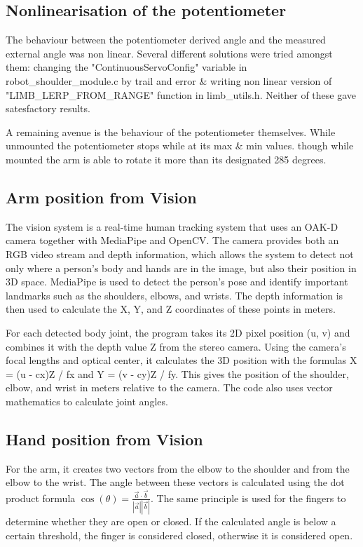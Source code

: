 \documentclass[a4paper]{article}
\begin{document}
\subsection{Nonlinearisation of the potentiometer}

The behaviour between the potentiometer derived angle and the measured external angle was non linear. 
Several different solutions were tried amongst them: changing the "ContinuousServoConfig" variable in robot\_shoulder\_module.c by trail and error \&
writing non linear version of "LIMB\_LERP\_FROM\_RANGE" function in limb\_utils.h. Neither of these gave satesfactory results.

A remaining avenue is the behaviour of the potentiometer themselves. While unmounted the potentiometer stops while at its max \& min values. though while mounted the arm is able to rotate it more than its designated 285 degrees. 

\subsection{Arm position from Vision}
The vision system is a real-time human tracking system that uses an OAK-D camera together with MediaPipe and OpenCV. The camera provides both an RGB video stream and depth information, which allows the system to detect not only where a person's body and hands are in the image, but also their position in 3D space. MediaPipe is used to detect the person's pose and identify important landmarks such as the shoulders, elbows, and wrists. The depth information is then used to calculate the X, Y, and Z coordinates of these points in meters. 

For each detected body joint, the program takes its 2D pixel position (u, v) and combines it with the depth value Z from the stereo camera. Using the camera's focal lengths and optical center, it calculates the 3D position with the formulas X = (u - cx)Z / fx and Y = (v - cy)Z / fy. This gives the position of the shoulder, elbow, and wrist in meters relative to the camera.  The code also uses vector mathematics to calculate joint angles. 

\subsection{Hand position from Vision}
For the arm, it creates two vectors from the elbow to the shoulder and from the elbow to the wrist. The angle between these vectors is calculated using the dot product formula \begin{math}
    \cos(\theta) = \frac{\vec{a} \cdot \vec{b}}{|\vec{a}||\vec{b}|}%
\end{math}. The same principle is used for the fingers to determine whether they are open or closed. If the calculated angle is below a certain threshold, the finger is considered closed, otherwise it is considered open.  
\end{document}
